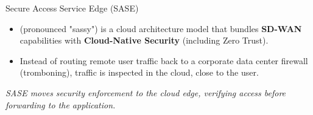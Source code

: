 \documentclass[aspectratio=169]{beamer}  %
\begin{document}
\begin{frame}[t]{Secure Access Service Edge (SASE)}
    \begin{itemize}
        \item {} (pronounced "sassy") is a cloud architecture model that bundles \textbf{SD-WAN} capabilities with \textbf{Cloud-Native Security} (including Zero Trust).
        \item Instead of routing remote user traffic back to a corporate data center firewall (tromboning), traffic is inspected in the cloud, close to the user.
    \end{itemize}
    \vspace{0.3em}
    \begin{center}
        \par\tiny\textit{SASE moves security enforcement to the cloud edge, verifying access before forwarding to the application.}
    \end{center}
\end{frame}
\end{document}

